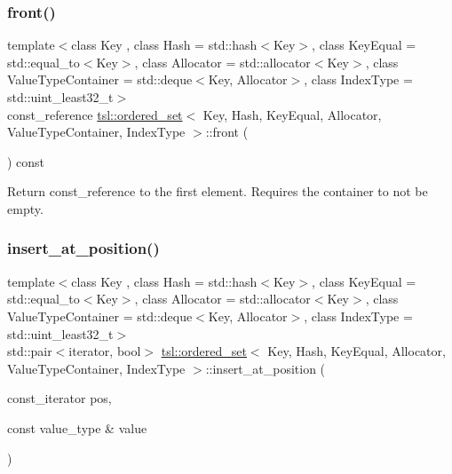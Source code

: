 \subsubsection{\texorpdfstring{front()}{front()}}
{\footnotesize\ttfamily template$<$class Key , class Hash  = std\+::hash$<$\+Key$>$, class Key\+Equal  = std\+::equal\+\_\+to$<$\+Key$>$, class Allocator  = std\+::allocator$<$\+Key$>$, class Value\+Type\+Container  = std\+::deque$<$\+Key, Allocator$>$, class Index\+Type  = std\+::uint\+\_\+least32\+\_\+t$>$ \\
const\+\_\+reference \mbox{\hyperlink{classtsl_1_1ordered__set}{tsl\+::ordered\+\_\+set}}$<$ Key, Hash, Key\+Equal, Allocator, Value\+Type\+Container, Index\+Type $>$\+::front (\begin{DoxyParamCaption}{ }\end{DoxyParamCaption}) const\hspace{0.3cm}{\ttfamily [inline]}}

Return const\+\_\+reference to the first element. Requires the container to not be empty. \mbox{\label{classtsl_1_1ordered__set_af03dd4f519aaaa11716a3eb3a7132446}} 
\subsubsection{\texorpdfstring{insert\_at\_position()}{insert\_at\_position()}\hspace{0.1cm}{\footnotesize\ttfamily [1/2]}}
{\footnotesize\ttfamily template$<$class Key , class Hash  = std\+::hash$<$\+Key$>$, class Key\+Equal  = std\+::equal\+\_\+to$<$\+Key$>$, class Allocator  = std\+::allocator$<$\+Key$>$, class Value\+Type\+Container  = std\+::deque$<$\+Key, Allocator$>$, class Index\+Type  = std\+::uint\+\_\+least32\+\_\+t$>$ \\
std\+::pair$<$iterator, bool$>$ \mbox{\hyperlink{classtsl_1_1ordered__set}{tsl\+::ordered\+\_\+set}}$<$ Key, Hash, Key\+Equal, Allocator, Value\+Type\+Container, Index\+Type $>$\+::insert\+\_\+at\+\_\+position (\begin{DoxyParamCaption}\item[{const\+\_\+iterator}]{pos,  }\item[{const value\+\_\+type \&}]{value }\end{DoxyParamCaption})\hspace{0.3cm}{\ttfamily [inline]}}

